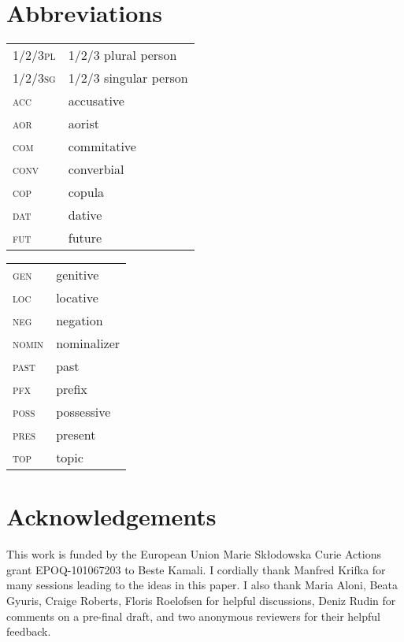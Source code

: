 \documentclass[output=paper,colorlinks,citecolor=brown]{langscibook}
\begin{document}







\section*{Abbreviations}
\begin{tabularx}{.5\textwidth}{@{}lQ@{}}
\textsc{1/2/3pl} & 1/2/3 plural person \\
\textsc{1/2/3sg} & 1/2/3 singular person \\
\textsc{acc} & accusative \\
\textsc{aor} & aorist \\
\textsc{com} & commitative \\
\textsc{conv} & converbial \\
\textsc{cop} & copula \\
\textsc{dat} & dative \\
\textsc{fut} & future \\
\end{tabularx}%
\begin{tabularx}{.5\textwidth}{@{}lQ@{}}
\textsc{gen} & genitive \\
\textsc{loc} & locative \\
\textsc{neg} & negation \\
\textsc{nomin} & nominalizer \\
\textsc{past} & past \\
\textsc{pfx} & prefix \\
\textsc{poss} & possessive \\
\textsc{pres} & present \\
\textsc{top} & topic \\
\end{tabularx}

\section*{Acknowledgements}
This work is funded by the European Union Marie Sk\l odowska Curie Actions grant EPOQ-101067203 to Beste Kamali. I cordially thank Manfred Krifka for many sessions leading to the ideas in this paper. I also thank Maria Aloni, Beata Gyuris, Craige Roberts, Floris Roelofsen for helpful discussions, Deniz Rudin for comments on a pre-final draft, and two anonymous reviewers for their helpful feedback. 

\sloppy
\printbibliography[heading=subbibliography,notkeyword=this]
\end{document}
